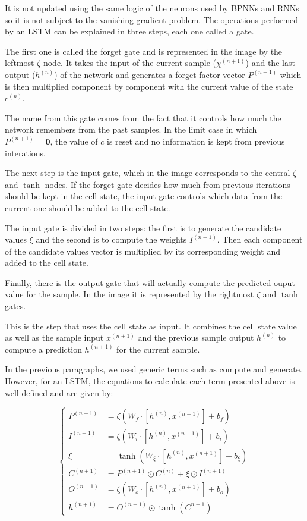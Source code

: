 It is not updated using the same logic of the neurons used by BPNNs and RNNs so it is not subject to the vanishing gradient problem.
The operations performed by an LSTM can be explained in three steps, each one called a gate.

The first one is called the forget gate and is represented in the image by the leftmost $\zeta$ node.
It takes the input of the current sample ($\chi^{(n+1)}$) and the last output ($h^{(n)}$) of the network and generates a forget factor vector $P^{(n+1)}$ which is then multiplied component by component with the current value of the state $c^{(n)}$.

The name from this gate comes from the fact that it controls how much the network remembers from the past samples.
In the limit case in which $P^{(n+1)} = \mathbf{0}$, the value of $c$ is reset and no information is kept from previous interations.

The next step is the input gate, which in the image corresponds to the central $\zeta$ and $\tanh$ nodes.
If the forget gate decides how much from previous iterations should be kept in the cell state, the input gate controls which data from the current one should be added to the cell state.

The input gate is divided in two steps: the first is to generate the candidate values $\xi$ and the second is to compute the weights $I^{(n+1)}$.
Then each component of the candidate values vector is multiplied by its corresponding weight and added to the cell state.

Finally, there is the output gate that will actually compute the predicted ouput value for the sample.
In the image it is represented by the rightmost $\zeta$ and $\tanh$ gates.

This is the step that uses the cell state as input.
It combines the cell state value as well as the sample input $x^{(n+1)}$ and the previous sample output $h^{(n)}$ to compute a prediction $h^{(n+1)}$ for the current sample. 

In the previous paragraphs, we used generic terms such as compute and generate.
However, for an LSTM, the equations to calculate each term presented above is well defined and are given by:

\begin{equation}\label{eq:lstm_calculations}
    \begin{cases}
        P^{(n+1)} &= \zeta(W_f\cdot[h^{(n)}, x^{(n+1)}] + b_f) \\
        I^{(n+1)} &= \zeta(W_i\cdot[h^{(n)}, x^{(n+1)}] + b_i) \\
        \xi &= \tanh(W_\xi\cdot[h^{(n)}, x^{(n+1)}] + b_\xi) \\
        C^{(n+1)} &= P^{(n+1)} \odot C^{(n)} + \xi \odot I^{(n+1)} \\
        O^{(n+1)} &= \zeta(W_o\cdot[h^{(n)}, x^{(n+1)}] + b_o) \\
        h^{(n+1)} &= O^{(n+1)} \odot \tanh(C^{n+1})
    \end{cases}
\end{equation}

